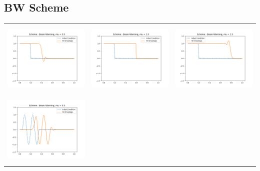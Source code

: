 \documentclass[a4paper,twoside,11pt]{article}
\begin{document}
      \newpage
      \subsection*{BW Scheme}
      \begin{table}[!h]
          \centering
          \begin{tabular}{ | c | m{5cm} | m{5cm} | }
            \hline
            \begin{minipage}{.3\textwidth}
              \includegraphics[width=\linewidth, height=3.5cm]{../plots/scheme5-IC1-mu0_5.png}
            \end{minipage}
            &
            \begin{minipage}{.3\textwidth}
              \includegraphics[width=\linewidth, height=3.5cm]{../plots/scheme5-IC1-mu1_0.png}
            \end{minipage}
            &
            \begin{minipage}{.3\textwidth}
              \includegraphics[width=\linewidth, height=3.5cm]{../plots/scheme5-IC1-mu1_5.png}
            \end{minipage} \\
            \begin{minipage}{.3\textwidth}
              \includegraphics[width=\linewidth, height=3.5cm]{../plots/scheme5-IC2-mu0_5.png}

\end{minipage}
\end{tabular}
\end{table}
\end{document}
